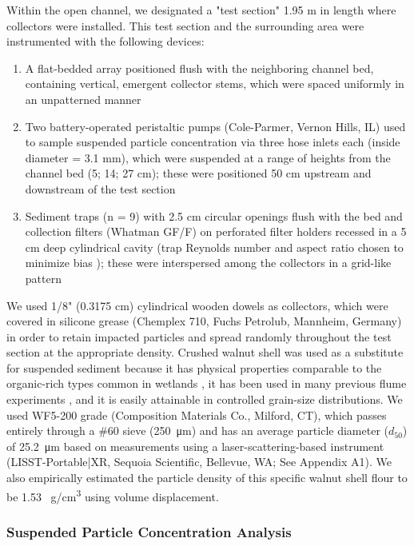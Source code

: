 \documentclass[geosciences,article,submit,moreauthors,pdftex]{Definitions/mdpi}
\begin{document}
Within the open channel, we designated a "test section" 1.95 m in length where collectors were installed. This test section and the surrounding area were instrumented with the following devices:
\begin{enumerate}
     \item A flat-bedded array positioned flush with the neighboring channel bed, containing vertical, emergent collector stems, which were spaced uniformly in an unpatterned manner
    \item Two battery-operated peristaltic pumps (Cole-Parmer, Vernon Hills, IL) used to sample suspended particle concentration via three hose inlets each (inside diameter = 3.1 mm), which were suspended at a range of heights from the channel bed (5; 14; 27 cm); these were positioned 50 cm upstream and downstream of the test section 
   \item Sediment traps (n = 9) with 2.5 cm circular openings flush with the bed and collection filters (Whatman GF/F) on perforated filter holders recessed in a 5 cm deep cylindrical cavity (trap Reynolds number and aspect ratio chosen to minimize bias \cite{butman1986sediment}); these were interspersed among the collectors in a grid-like pattern
\end{enumerate}

We used 1/8" (0.3175 cm) cylindrical wooden dowels as collectors, which were covered in silicone grease (Chemplex 710, Fuchs Petrolub, Mannheim, Germany) in order to retain impacted particles and spread randomly throughout the test section at the appropriate density. Crushed walnut shell was used as a substitute for suspended sediment because it has physical properties comparable to the organic-rich types common in wetlands \cite{muller2017experiments, jenzer2015sediment, redding2006particle}, it has been used in many previous flume experiments \cite{baar2018sediment,fisher1983organic,tlili2013effect}, and it is easily attainable in controlled grain-size distributions. We used WF5-200 grade (Composition Materials Co., Milford, CT), which passes entirely through a \#60 sieve (\SI{250}{\micro\metre}) and has an average particle diameter ($d_{50}$) of \SI{25.2}{\micro\metre} based on measurements using a laser-scattering-based instrument (LISST-Portable|XR, Sequoia Scientific, Bellevue, WA; See Appendix A1). We also empirically estimated the particle density of this specific walnut shell flour to be 1.53 \SI{}{\gram/\centi\metre\cubed} using volume displacement.

\subsubsection{Suspended Particle Concentration Analysis}
\end{document}
